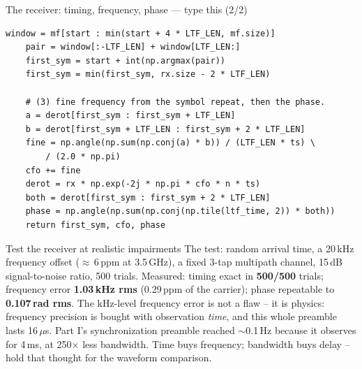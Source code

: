 \documentclass[10pt]{beamer}
\begin{document}
\begin{frame}[fragile]{The receiver: timing, frequency, phase --- type this (2/2)}
\begin{lstlisting}[basicstyle=\ttfamily\tiny]
    window = mf[start : min(start + 4 * LTF_LEN, mf.size)]
    pair = window[:-LTF_LEN] + window[LTF_LEN:]
    first_sym = start + int(np.argmax(pair))
    first_sym = min(first_sym, rx.size - 2 * LTF_LEN)

    # (3) fine frequency from the symbol repeat, then the phase.
    a = derot[first_sym : first_sym + LTF_LEN]
    b = derot[first_sym + LTF_LEN : first_sym + 2 * LTF_LEN]
    fine = np.angle(np.sum(np.conj(a) * b)) / (LTF_LEN * ts) \
        / (2.0 * np.pi)
    cfo += fine
    derot = rx * np.exp(-2j * np.pi * cfo * n * ts)
    both = derot[first_sym : first_sym + 2 * LTF_LEN]
    phase = np.angle(np.sum(np.conj(np.tile(ltf_time, 2)) * both))
    return first_sym, cfo, phase
\end{lstlisting}
\end{frame}

\begin{frame}{Test the receiver at realistic impairments}
  The test: random arrival time, a 20\,kHz frequency offset
  ($\approx$\,6\,ppm at 3.5\,GHz), a fixed 3-tap multipath
  channel, 15\,dB signal-to-noise ratio, 500 trials.
  Measured: timing exact in \textbf{500/500} trials;
  frequency error \textbf{1.03\,kHz rms} (0.29\,ppm of the
  carrier); phase repeatable to \textbf{0.107\,rad rms}.
  The kHz-level frequency error is not a flaw -- it is
  physics: frequency precision is bought with observation
  \emph{time}, and this whole preamble lasts 16\,$\mu$s.
  Part I's synchronization preamble reached $\sim$0.1\,Hz
  because it observes for 4\,ms, at 250$\times$ less
  bandwidth. Time buys frequency; bandwidth buys delay --
  hold that thought for the waveform comparison.
\end{frame}
\end{document}
